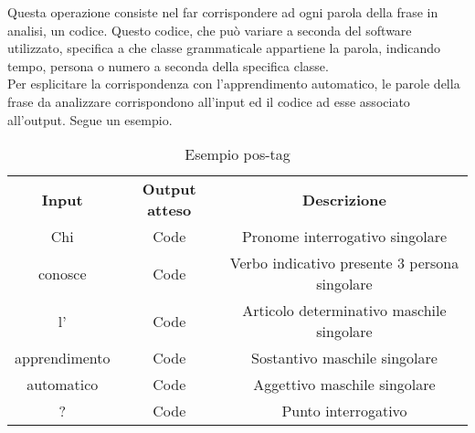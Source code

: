 Questa operazione consiste nel far corrispondere ad ogni parola della frase in analisi, un codice. Questo codice, che può variare a seconda del software utilizzato, specifica a che classe grammaticale appartiene la parola, indicando tempo, persona o numero a seconda della specifica classe. \\
Per esplicitare la corrispondenza con l'apprendimento automatico, le parole della frase da analizzare corrispondono all'input ed il codice ad esse associato all'output. Segue un esempio. 
\medskip

\begin{table}[h]
\centering
\begin{tabular}{| c | c | c |}
		\rowcolor{LightBlue}
		\color{white}\bfseries Input & \color{white}\bfseries Output atteso & \color{white}\bfseries Descrizione \\[0.25cm]
		 Chi & Code & Pronome interrogativo singolare \\
		 conosce & Code & Verbo indicativo presente 3 persona singolare \\
		 l' & Code & Articolo determinativo maschile singolare \\
		 apprendimento & Code & Sostantivo maschile singolare \\
		 automatico & Code & Aggettivo maschile singolare \\ 
		 ? & Code & Punto interrogativo \\ \hline
\end{tabular}
		\caption{Esempio pos-tag}
\end{table}